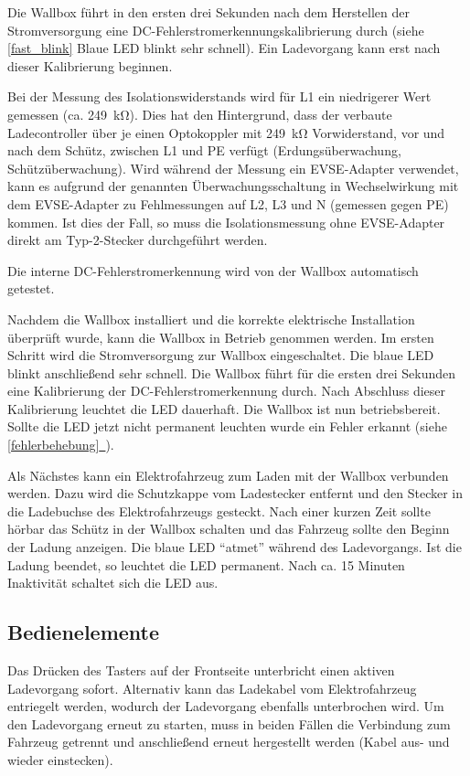 \documentclass[a4paper,10pt]{article}
\newcommand*{\fullref}[1]{\hyperref[{#1}]{\ref*{#1}~\nameref*{#1}}}
\begin{document}
\begin{multicols*}{2}
	Die Wallbox führt in den ersten drei Sekunden nach dem Herstellen der Stromversorgung
	eine DC-Fehlerstromerkennungskalibrierung durch (siehe \ref{fast_blink} Blaue LED blinkt sehr schnell).
	Ein Ladevorgang kann erst nach dieser Kalibrierung beginnen.

	Bei der Messung des Isolationswiderstands wird für L1 ein niedrigerer Wert
	gemessen (ca. \SI{249}{\kilo\ohm}). Dies hat den Hintergrund, dass
	der verbaute Ladecontroller über je einen Optokoppler mit
	\SI{249}{\kilo\ohm} Vorwiderstand, vor und nach dem Schütz, zwischen L1 und
	PE verfügt (Erdungsüberwachung, Schützüberwachung). Wird während der Messung ein EVSE-Adapter verwendet,
	kann es aufgrund der genannten Überwachungsschaltung in Wechselwirkung mit dem EVSE-Adapter zu Fehlmessungen
	auf L2, L3 und N (gemessen gegen PE) kommen. Ist dies der Fall, so muss die Isolationsmessung
	ohne EVSE-Adapter direkt am Typ-2-Stecker durchgeführt werden.

	Die interne DC-Fehlerstromerkennung wird von der Wallbox automatisch getestet.

	Nachdem die Wallbox installiert
	und die korrekte elektrische Installation überprüft wurde, kann die Wallbox in
	Betrieb genommen werden.
	Im ersten Schritt wird die Stromversorgung zur Wallbox eingeschaltet. Die
	blaue LED blinkt anschließend sehr schnell. Die Wallbox führt
	für die ersten drei Sekunden eine Kalibrierung der
	DC-Fehlerstromerkennung durch. Nach Abschluss dieser Kalibrierung
	leuchtet die LED dauerhaft. Die Wallbox ist nun betriebsbereit. Sollte die LED jetzt
	nicht permanent leuchten wurde ein Fehler erkannt (siehe \fullref{fehlerbehebung}).

	Als Nächstes kann ein Elektrofahrzeug zum Laden mit der Wallbox verbunden
	werden. Dazu wird die Schutzkappe vom Ladestecker entfernt und den Stecker in die
	Ladebuchse des Elektrofahrzeugs gesteckt. Nach einer kurzen Zeit sollte hörbar
	das Schütz in der Wallbox schalten und das Fahrzeug sollte den Beginn
	der Ladung anzeigen. Die blaue LED \enquote{atmet} während des
	Ladevorgangs. Ist die Ladung beendet, so leuchtet die LED permanent. Nach ca.
	15 Minuten Inaktivität schaltet sich die LED aus.

	\subsection{Bedienelemente}\label{lockswitch}
	Das Drücken des Tasters auf der Frontseite unterbricht einen aktiven Ladevorgang
	sofort. Alternativ kann das Ladekabel vom Elektrofahrzeug entriegelt werden,
	wodurch der Ladevorgang ebenfalls unterbrochen wird. Um den Ladevorgang erneut
	zu starten, muss in beiden Fällen die Verbindung zum Fahrzeug getrennt und
	anschließend erneut hergestellt werden (Kabel aus- und wieder einstecken).


\end{multicols*}
\end{document}
